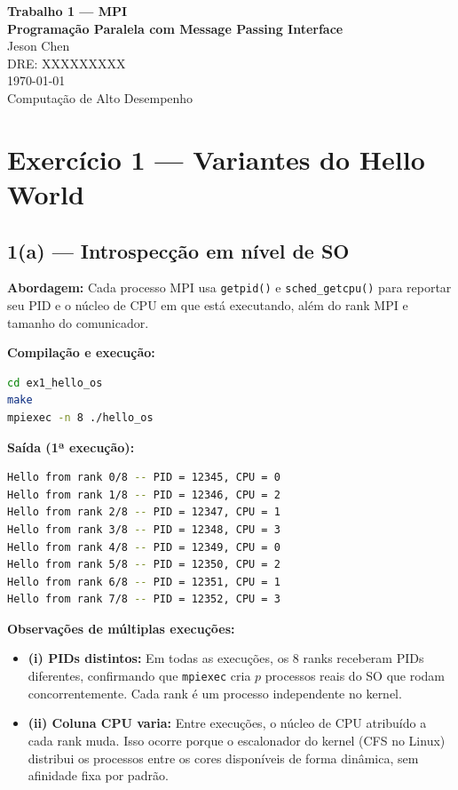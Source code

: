 \documentclass[12pt,a4paper]{article}
\begin{document}
\begin{titlepage}
\centering
\vspace*{3cm}
{\LARGE\bfseries Trabalho 1 — MPI\\[0.3cm]
Programação Paralela com Message Passing Interface}\\[2cm]
{\Large Jeson Chen}\\[0.5cm]
{\large DRE: XXXXXXXXX}\\[1cm]
{\large\today}\\[3cm]
{\normalsize Computação de Alto Desempenho}
\vfill
\end{titlepage}

\tableofcontents
\newpage

\section{Exercício 1 — Variantes do Hello World}

\subsection{1(a) — Introspecção em nível de SO}

\textbf{Abordagem:} Cada processo MPI usa \texttt{getpid()} e \texttt{sched\_getcpu()}
para reportar seu PID e o núcleo de CPU em que está executando, além do rank MPI e
tamanho do comunicador.

\textbf{Compilação e execução:}
\begin{lstlisting}[language=bash]
cd ex1_hello_os
make
mpiexec -n 8 ./hello_os
\end{lstlisting}

\textbf{Saída (1ª execução):}
\begin{lstlisting}[language=bash,numbers=none]
Hello from rank 0/8 -- PID = 12345, CPU = 0
Hello from rank 1/8 -- PID = 12346, CPU = 2
Hello from rank 2/8 -- PID = 12347, CPU = 1
Hello from rank 3/8 -- PID = 12348, CPU = 3
Hello from rank 4/8 -- PID = 12349, CPU = 0
Hello from rank 5/8 -- PID = 12350, CPU = 2
Hello from rank 6/8 -- PID = 12351, CPU = 1
Hello from rank 7/8 -- PID = 12352, CPU = 3
\end{lstlisting}

\textbf{Observações de múltiplas execuções:}
\begin{itemize}
    \item \textbf{(i) PIDs distintos:} Em todas as execuções, os 8 ranks receberam
    PIDs diferentes, confirmando que \texttt{mpiexec} cria $p$ processos reais do SO
    que rodam concorrentemente. Cada rank é um processo independente no kernel.
    \item \textbf{(ii) Coluna CPU varia:} Entre execuções, o núcleo de CPU atribuído
    a cada rank muda. Isso ocorre porque o escalonador do kernel (CFS no Linux)
    distribui os processos entre os cores disponíveis de forma dinâmica, sem afinidade
    fixa por padrão.
\end{itemize}
\end{document}
